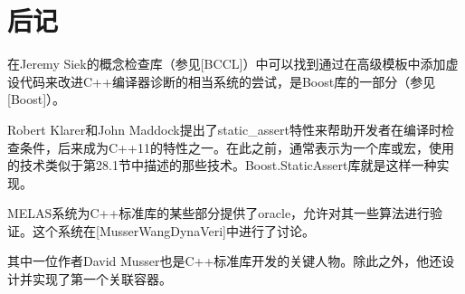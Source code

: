 \section{后记}
在Jeremy Siek的概念检查库（参见[BCCL]）中可以找到通过在高级模板中添加虚设代码来改进C++编译器诊断的相当系统的尝试，是Boost库的一部分（参见[Boost]）。

Robert Klarer和John Maddock提出了static\_assert特性来帮助开发者在编译时检查条件，后来成为C++11的特性之一。在此之前，通常表示为一个库或宏，使用的技术类似于第28.1节中描述的那些技术。Boost.StaticAssert库就是这样一种实现。

MELAS系统为C++标准库的某些部分提供了oracle，允许对其一些算法进行验证。这个系统在[MusserWangDynaVeri]中进行了讨论。

\begin{notice}
其中一位作者David Musser也是C++标准库开发的关键人物。除此之外，他还设计并实现了第一个关联容器。
\end{notice}
